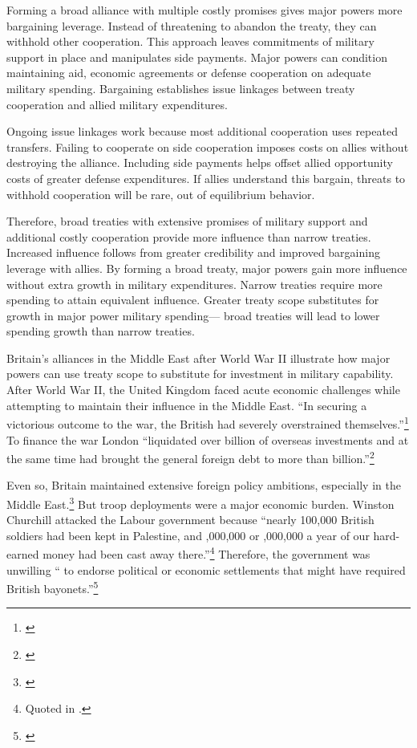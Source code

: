 \documentclass[12pt]{article}
\begin{document}
 
Forming a broad alliance with multiple costly promises gives major powers more bargaining leverage. 
Instead of threatening to abandon the treaty, they can withhold other cooperation.
This approach leaves commitments of military support in place and manipulates side payments.  
Major powers can condition maintaining aid, economic agreements or defense cooperation on adequate military spending.
Bargaining establishes issue linkages between treaty cooperation and allied military expenditures. 


Ongoing issue linkages work because most additional cooperation uses repeated transfers. 
Failing to cooperate on side cooperation imposes costs on allies without destroying the alliance. 
Including side payments helps offset allied opportunity costs of greater defense expenditures. 
If allies understand this bargain, threats to withhold cooperation will be rare, out of equilibrium behavior. 


Therefore, broad treaties with extensive promises of military support and additional costly cooperation provide more influence than narrow treaties.
Increased influence follows from greater credibility and improved bargaining leverage with allies.  
By forming a broad treaty, major powers gain more influence without extra growth in military expenditures. 
Narrow treaties require more spending to attain equivalent influence. 
Greater treaty scope substitutes for growth in major power military spending--- broad treaties will lead to lower spending growth than narrow treaties. 


Britain's alliances in the Middle East after World War II illustrate how major powers can use treaty scope to substitute for investment in military capability. 
After World War II, the United Kingdom faced acute economic challenges while attempting to maintain their influence in the Middle East. 
``In securing a victorious outcome to the war, the British had severely overstrained themselves.''\footnote{\citet[pg. 367]{Kennedy1987}}
To finance the war London ``liquidated over  billion of overseas investments and at the same time had brought the general foreign debt to more than  billion.''\footnote{\citet[pg. 12]{Louis1984}}
 

Even so, Britain maintained extensive foreign policy ambitions, especially in the Middle East.\footnote{\cite{Mayhew1950, Rahman1982}} 
But troop deployments were a major economic burden. 
Winston Churchill attacked the Labour government because ``nearly 100,000 British soldiers had been kept in Palestine, and ,000,000 or ,000,000 a year of our hard-earned money had been cast away there.''\footnote{Quoted in \citet[pg. 11]{Louis1984}.}
Therefore, the government was unwilling `` to endorse political or economic settlements that might have required British bayonets.''\footnote{\citet[pg. 15]{Louis1984}}
\end{document}
